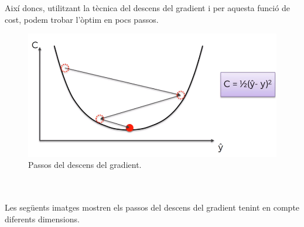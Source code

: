 \documentclass[12pt]{article}
\begin{document}
\\\\Així doncs, utilitzant la tècnica del descens del gradient i per aquesta funció de cost, podem trobar l'òptim en pocs passos.
\begin{figure}[h!]
	\centering
	\includegraphics[scale=0.3]{imatges/dg/6dg6.png}
	\caption{Passos del descens del gradient.}
\end{figure}
\pagebreak 
\\\\Les següents imatges mostren els passos del descens del gradient tenint en compte diferents dimensions.
\end{document}

